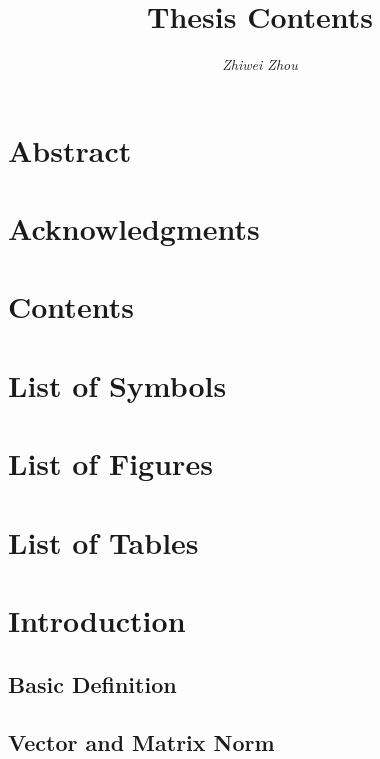 \documentclass[11pt]{article}
\title{\textbf{Thesis Contents}}
\author{\textit{Zhiwei Zhou}}
\begin{document}
\maketitle






\section*{Abstract}
\section*{Acknowledgments}
\section*{Contents}
\section{List of Symbols}


\section{List of Figures}


\section{List of Tables}





\section{Introduction}


\subsection{Basic Definition}

\subsection{Vector and Matrix Norm}
\end{document}
